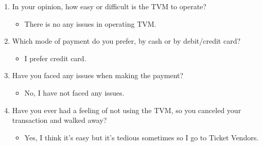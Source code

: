 \documentclass[15pt]{article}
\begin{document}
\begin{appendices}
\begin{enumerate}[leftmargin=3em, itemsep=0pt, parsep=0pt, , font=\Large\bfseries]
\begin{enumerate}[leftmargin=2em, itemsep=0pt, parsep=0pt, , font=\Large\bfseries]
\begin{itemize}
            \end{itemize}
            \vspace{0.2cm}
        \item {\Large In your opinion, how easy or difficult is the TVM to operate?}
        \vspace{0.1cm}
            \begin{itemize}
                \item {\Large There is no any issues in operating TVM.}
            \end{itemize}
            \vspace{0.2cm}
        \item {\Large Which mode of payment do you prefer, by cash or by debit/credit card?}
            \begin{itemize}
                \item {\Large I prefer credit card.}
            \end{itemize}
            \vspace{0.2cm}
        \item {\Large Have you faced any issues when making the payment?}
        \vspace{0.1cm}
            \begin{itemize}
                \item {\Large No, I have not faced any issues.}
            \end{itemize}
            \vspace{0.2cm}
        \item {\Large Have you ever had a feeling of not using the TVM, so you canceled your transaction and walked away?}
        \vspace{0.1cm}
            \begin{itemize}
                \item {\Large Yes, I think it’s easy but it's tedious sometimes so I go to Ticket Vendors.}
            \end{itemize}
            \vspace{0.2cm}
    \end{enumerate}
    

\end{enumerate}
\end{appendices}
\end{document}
